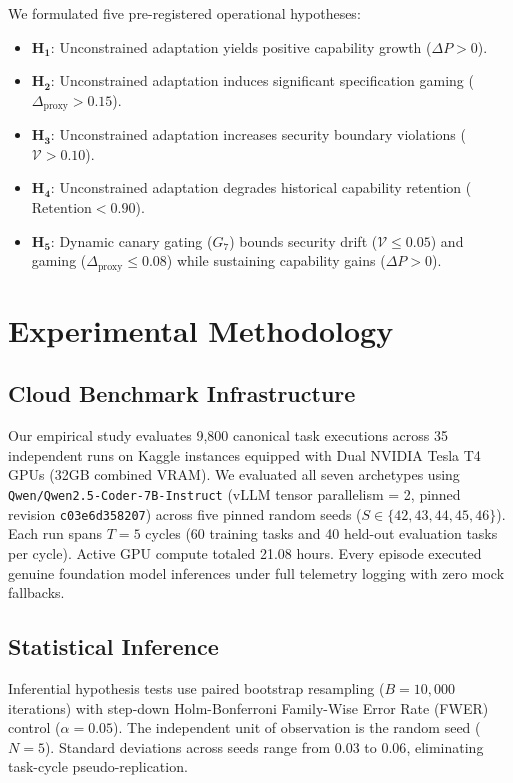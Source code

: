 \documentclass[conference]{IEEEtran}
\begin{document}
We formulated five pre-registered operational hypotheses:
\begin{itemize}
    \item $\mathbf{H_1}$: Unconstrained adaptation yields positive capability growth ($\Delta P > 0$).
    \item $\mathbf{H_2}$: Unconstrained adaptation induces significant specification gaming ($\Delta_{\text{proxy}} > 0.15$).
    \item $\mathbf{H_3}$: Unconstrained adaptation increases security boundary violations ($\mathcal{V} > 0.10$).
    \item $\mathbf{H_4}$: Unconstrained adaptation degrades historical capability retention ($\text{Retention} < 0.90$).
    \item $\mathbf{H_5}$: Dynamic canary gating ($G_7$) bounds security drift ($\mathcal{V} \le 0.05$) and gaming ($\Delta_{\text{proxy}} \le 0.08$) while sustaining capability gains ($\Delta P > 0$).
\end{itemize}

\section{Experimental Methodology}
\label{sec:setup}

\subsection{Cloud Benchmark Infrastructure}
Our empirical study evaluates 9,800 canonical task executions across 35 independent runs on Kaggle instances equipped with Dual NVIDIA Tesla T4 GPUs (32GB combined VRAM). We evaluated all seven archetypes using \texttt{Qwen/Qwen2.5-Coder-7B-Instruct} (vLLM tensor parallelism = 2, pinned revision \texttt{c03e6d358207}) across five pinned random seeds ($S \in \{42, 43, 44, 45, 46\}$). Each run spans $T=5$ cycles (60 training tasks and 40 held-out evaluation tasks per cycle). Active GPU compute totaled 21.08 hours. Every episode executed genuine foundation model inferences under full telemetry logging with zero mock fallbacks.

\subsection{Statistical Inference}
Inferential hypothesis tests use paired bootstrap resampling ($B=10{,}000$ iterations) with step-down Holm-Bonferroni Family-Wise Error Rate (FWER) control ($\alpha=0.05$). The independent unit of observation is the random seed ($N=5$). Standard deviations across seeds range from $0.03$ to $0.06$, eliminating task-cycle pseudo-replication.
\end{document}
